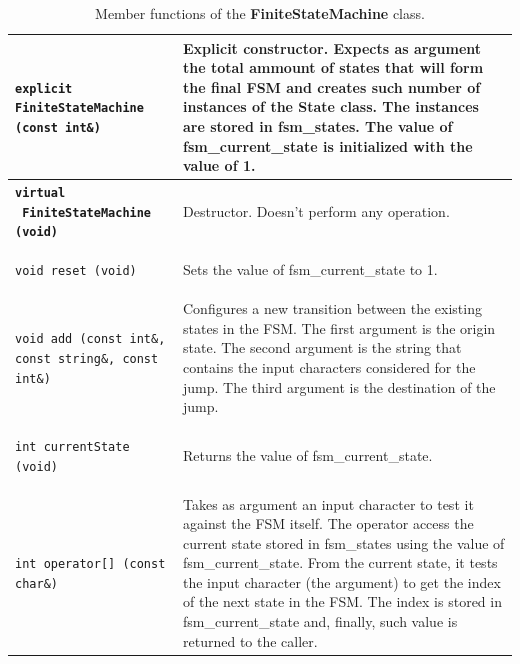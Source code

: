 \documentclass[11pt,twoside,openany,x11names,svgnames]{memoir}
\begin{document}
\begin{table}[h]\footnotesize
\centering
\begin{tabular}{| >{\bfseries}p{8cm} | p{7.5cm} |}
	\hline
	
	\texttt{explicit FiniteStateMachine (const int\&)} & Explicit constructor. Expects as argument the total ammount of states that will form the final FSM and creates such number of instances of the State class. The instances are stored in fsm\_states. The value of fsm\_current\_state is initialized with the value of 1. \\
	
	\hline
	
	\texttt{virtual ~FiniteStateMachine (void)} & Destructor. Doesn't perform any operation. \\
	
	\hline
	
	\texttt{void reset (void)} & Sets the value of fsm\_current\_state to 1. \\
	
	\hline
	
	\texttt{void add (const int\&, const string\&, const int\&)} & Configures a new transition between the existing states in the FSM. The first argument is the origin state. The second argument is the string that contains the input characters considered for the jump. The third argument is the destination of the jump. \\
	
	\hline
	
	\texttt{int currentState (void)} & Returns the value of fsm\_current\_state. \\
	
	\hline
	
	\texttt{int operator[] (const char\&)} & Takes as argument an input character to test it against the FSM itself. The operator access the current state stored in fsm\_states using the value of fsm\_current\_state. From the current state, it tests the input character (the argument) to get the index of the next state in the FSM. The index is stored in fsm\_current\_state and, finally, such value is returned to the caller. \\
	
	\hline
\end{tabular}
\caption{Member functions of the \textbf{FiniteStateMachine} class.}
\label{tab:FiniteStateMachine-MemberFunctions}
\end{table}

\newpage 
\end{document}
